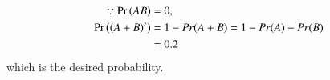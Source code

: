 \begin{align}
	\because \Pr\left(AB\right) &= 0,
	\\
	\Pr\left(\left(A+B\right)^\prime\right) &= 1 - Pr(A+B) = 1-Pr(A)-Pr(B)\\
	&= 0.2
\end{align}
which is  the desired probability.  
